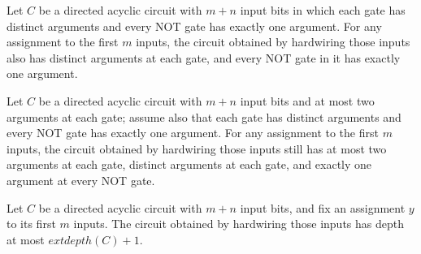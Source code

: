 \begin{theorem}
\label{BoolCircuit.DAGCircuit.hardwireLeft_isWellFormed}
\leanok
{}
Let $C$ be a directed acyclic circuit with $m+n$ input bits in which each gate has
distinct arguments and every NOT gate has exactly one argument. For any assignment to
the first $m$ inputs, the circuit obtained by hardwiring those inputs also has distinct
arguments at each gate, and every NOT gate in it has exactly one argument.
\end{theorem}

\begin{theorem}
\label{BoolCircuit.DAGCircuit.hardwireLeft_isFaninTwo}
\leanok
{}
Let $C$ be a directed acyclic circuit with $m+n$ input bits and at most two arguments at
each gate; assume also that each gate has distinct arguments and every NOT gate has
exactly one argument. For any assignment to the first $m$ inputs, the circuit obtained
by hardwiring those inputs still has at most two arguments at each gate, distinct
arguments at each gate, and exactly one argument at every NOT gate.
\end{theorem}

\begin{theorem}
\label{BoolCircuit.DAGCircuit.hardwireLeft_depth_le}
\leanok
{}
Let $C$ be a directed acyclic circuit with $m+n$ input bits, and fix an assignment $y$
to its first $m$ inputs. The circuit obtained by hardwiring those inputs has depth at
most $	ext{depth}(C)+1$.
\end{theorem}

